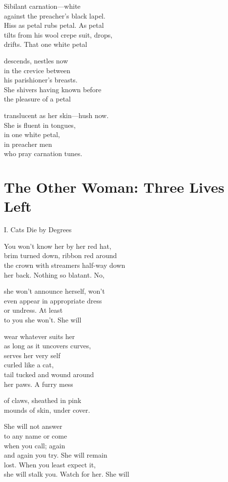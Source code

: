 \documentclass[twoside,10pt]{book}
\begin{document}
Sibilant carnation---white\\
against the preacher's black lapel.\\
Hiss as petal rubs petal. As petal\\
tilts from his wool crepe suit, drops,\\
drifts. That one white petal

descends, nestles now\\
in the crevice between\\
his parishioner's breasts.\\
She shivers having known before\\
the pleasure of a petal

translucent as her skin---hush now.\\
She is fluent in tongues,\\
in one white petal,\\
in preacher men\\
who pray carnation tunes.


\clearpage
\section{The Other Woman: Three Lives Left}

I. Cats Die by Degrees

You won't know her by her red hat,\\
brim turned down, ribbon red around\\
the crown with streamers half-way down\\
her back. Nothing so blatant. No,

she won't announce herself, won't\\
even appear in appropriate dress\\
or undress. At least\\
to you she won't. She will

wear whatever suits her\\
as long as it uncovers curves,\\
serves her very self\\
curled like a cat,\\
tail tucked and wound around\\
her paws. A furry mess

of claws, sheathed in pink\\
mounds of skin, under cover.

She will not answer\\
to any name or come\\
when you call; again\\
and again you try. She will remain\\
lost. When you least expect it,\\
she will stalk you. Watch for her. She will
\end{document}

